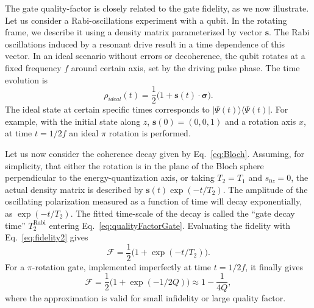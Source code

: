 \documentclass[aps, prx, showpacs, twocolumn, superscriptaddress, notitlepage, longbibliography, floatfix, nofootinbib]{revtex4-2}
\newcommand{\TRabi}{T_2^\mathrm{Rabi}}
\begin{document}
\label{app:fidelity-quality}

The gate quality-factor is closely related to the gate fidelity, as we now illustrate. Let us consider a Rabi-oscillations experiment with a qubit. In the rotating frame, we describe it using a density matrix parameterized by vector $\mathbf{s}$. The Rabi oscillations induced by a resonant drive result in a time dependence of this vector. In an ideal scenario without errors or decoherence, the qubit rotates at a fixed frequency $f$ around certain axis, set by the driving pulse phase. The time evolution is 
\begin{equation}
\rho_{ideal}(t) = \frac{1}{2}\Big(1+\mathbf{s}(t) \cdot \boldsymbol{\sigma}\Big).
\end{equation}
The ideal state at certain specific times corresponds to $|\Psi(t)\rangle\langle\Psi(t)|$. For example, with the initial state along $z$, $\mathbf{s}(0)=(0,0,1)$ and a rotation axis $x$, at time $t=1/2f$ an ideal $\pi$ rotation is performed. 

Let us now consider the coherence decay given by Eq.~\eqref{eq:Bloch}. Assuming, for simplicity, that either the rotation is in the plane of the Bloch sphere perpendicular to the energy-quantization axis, or taking $T_2=T_1$ and $s_{0z}=0$, the actual density matrix is described by $\mathbf{s}(t) \exp(-t/T_2)$. The amplitude of the oscillating polarization measured as a function of time will decay exponentially, as $\exp(-t/T_2)$. The fitted time-scale of the decay is called the ``gate decay time'' $ \TRabi$ entering Eq.~\eqref{eq:qualityFactorGate}. Evaluating the fidelity with Eq.~\eqref{eq:fidelity2} gives
\begin{equation}
\mathcal{F} = \frac{1}{2}\big(1+\exp(-t/T_2) \big).
\end{equation}
For a $\pi$-rotation gate, implemented imperfectly at time $t=1/2f$, it finally gives
\begin{equation}
\mathcal{F} = \frac{1}{2}\big(1+\exp(-1/2Q) \big) \approx 1 - \frac{1}{4Q},
\label{eq:fidelityQualityRelation}
\end{equation}
where the approximation is valid for small infidelity or large quality factor. 
\end{document}
